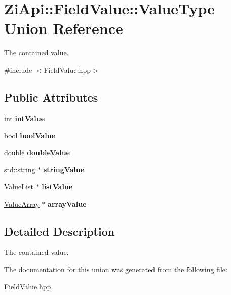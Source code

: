 \hypertarget{unionZiApi_1_1FieldValue_1_1ValueType}{}\section{Zi\+Api\+::Field\+Value\+::Value\+Type Union Reference}
\label{unionZiApi_1_1FieldValue_1_1ValueType}


The contained value.  




{\ttfamily \#include $<$Field\+Value.\+hpp$>$}

\subsection*{Public Attributes}
\begin{DoxyCompactItemize}
\item 
\mbox{\label{unionZiApi_1_1FieldValue_1_1ValueType_ae39dcb1763d45865d26ccf1700224cf8}} 
int {\bfseries int\+Value}
\item 
\mbox{\label{unionZiApi_1_1FieldValue_1_1ValueType_a2505507a6993c9dc9e77ebced69ed814}} 
bool {\bfseries bool\+Value}
\item 
\mbox{\label{unionZiApi_1_1FieldValue_1_1ValueType_ab2e82b42c6219a857ca33c441db2c076}} 
double {\bfseries double\+Value}
\item 
\mbox{\label{unionZiApi_1_1FieldValue_1_1ValueType_a9a9d797944b728dd8a42070eeda36eb4}} 
std\+::string $\ast$ {\bfseries string\+Value}
\item 
\mbox{\label{unionZiApi_1_1FieldValue_1_1ValueType_a43ed94e3fff440915b8c5c3e946156dc}} 
\mbox{\hyperlink{classZiApi_1_1FieldValue_a80ee7fc5fc9c95e80ef61929b277c5e5}{Value\+List}} $\ast$ {\bfseries list\+Value}
\item 
\mbox{\label{unionZiApi_1_1FieldValue_1_1ValueType_aa845068ed1bbafd95b8b518f34a0733a}} 
\mbox{\hyperlink{classZiApi_1_1FieldValue_a879443efd90b1669535916854847a239}{Value\+Array}} $\ast$ {\bfseries array\+Value}
\end{DoxyCompactItemize}


\subsection{Detailed Description}
The contained value. 

The documentation for this union was generated from the following file\+:\begin{DoxyCompactItemize}
\item 
Field\+Value.\+hpp\end{DoxyCompactItemize}
